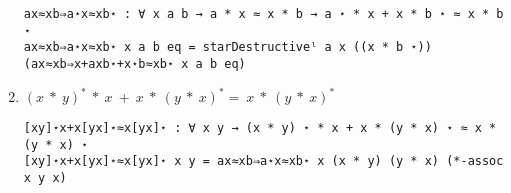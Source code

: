 \begin{enumerate}
\begin{verbatim}
ax≈xb⇒a⋆x≈xb⋆ : ∀ x a b → a * x ≈ x * b → a ⋆ * x + x * b ⋆ ≈ x * b ⋆
ax≈xb⇒a⋆x≈xb⋆ x a b eq = starDestructiveˡ a x ((x * b ⋆)) (ax≈xb⇒x+axb⋆+x⋆b≈xb⋆ x a b eq)
\end{verbatim}


\item $(x\ *\ y)^{*}\ *\ x\ +\ x\ *\ (y\ *\ x)^{*} =\ x\ *\ (y\ *\ x)^{*}$

\begin{verbatim}
[xy]⋆x+x[yx]⋆≈x[yx]⋆ : ∀ x y → (x * y) ⋆ * x + x * (y * x) ⋆ ≈ x * (y * x) ⋆
[xy]⋆x+x[yx]⋆≈x[yx]⋆ x y = ax≈xb⇒a⋆x≈xb⋆ x (x * y) (y * x) (*-assoc x y x)
\end{verbatim}

\end{enumerate}